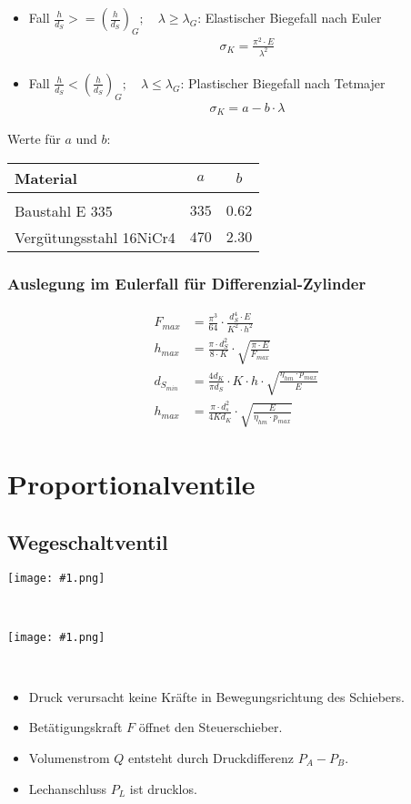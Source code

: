 \documentclass[landscape,a4paper,10pt]{article}
\newcommand{\graphiccol}[1]{
\noindent
\begin{minipage}{\columnwidth}
\centering
\texttt{[image: \#1.png]}
\end{minipage}
\medskip \\
}
\begin{document}
\begin{multicols*}{3}
\begin{itemize}
\item Fall $\frac{h}{d_S} >= \left( \frac{h}{d_S}\right)_G; \quad \lambda \geq \lambda_G$:
Elastischer Biegefall nach Euler
\begin{align*}
\sigma_K = \frac{\pi^2 \cdot E}{\lambda^2}
\end{align*}
%
\item Fall $\frac{h}{d_S} < \left( \frac{h}{d_S}\right)_G; \quad \lambda \leq \lambda_G$: 
Plastischer Biegefall nach Tetmajer
\begin{align*}
\sigma_K = a-b \cdot \lambda
\end{align*}
\end{itemize}

Werte für $a$ und $b$: \\

\begin{tabular}{lcc}
Material & $a$ & $b$ \\
\hline \\
Baustahl E 335 & $335$ & $0.62$ \\
Vergütungsstahl 16NiCr4 & $470$ & $2.30$
\end{tabular}


\subsubsection*{Auslegung im Eulerfall für Differenzial-Zylinder}
\begin{align*}
F_{max} &= \frac{\pi^3}{64} \cdot \frac{d_S^4 \cdot E}{K^2 \cdot h^2} \\
h_{max} &= \frac{\pi \cdot d_S^2}{8 \cdot K} \cdot \sqrt{\frac{\pi \cdot E}{F_{max}} } \\
d_{S_{min}} &= \frac{4 d_K}{\pi d_S} \cdot K \cdot h \cdot \sqrt{\frac{\eta_{hm} \cdot p_{max}}{E} } \\
h_{max} &= \frac{\pi \cdot d_s^2}{4 K d_K} \cdot \sqrt{\frac{E}{\eta_{hm} \cdot p_{max}} }
\end{align*}


\newpage
\section{Proportionalventile}
\subsection{Wegeschaltventil}

\graphiccol{wegeschaltventil1}
\graphiccol{wegeschaltventil2}
\begin{itemize}
\item Druck verursacht keine Kräfte in Bewegungsrichtung des Schiebers.
\item Betätigungskraft $F$ öffnet den Steuerschieber.
\item Volumenstrom $Q$ entsteht durch Druckdifferenz $P_A - P_B$.
\item Lechanschluss $P_L$ ist drucklos. 
\end{itemize}




\end{multicols*}
\end{document}
